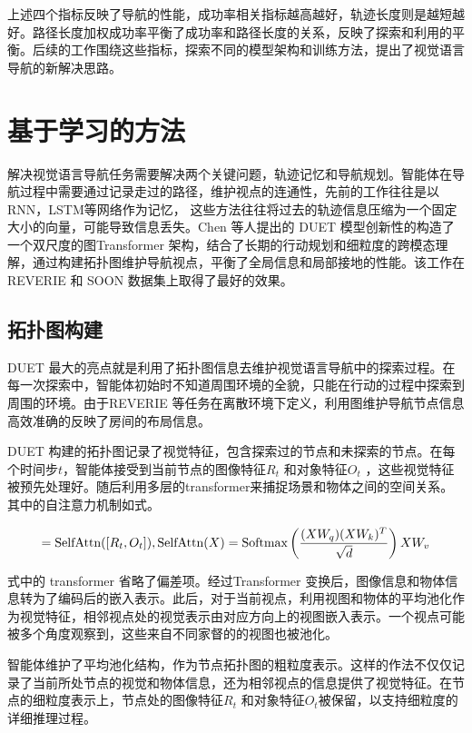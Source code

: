 \documentclass[bachelor]{thesis-uestc}
\begin{document}
上述四个指标反映了导航的性能，成功率相关指标越高越好，轨迹长度则是越短越好。路径长度加权成功率平衡了成功率和路径长度的关系，反映了探索和利用的平衡。后续的工作围绕这些指标，探索不同的模型架构和训练方法，提出了视觉语言导航的新解决思路。

\section{基于学习的方法}

解决视觉语言导航任务需要解决两个关键问题，轨迹记忆和导航规划。智能体在导航过程中需要通过记录走过的路径，维护视点的连通性，先前的工作往往是以RNN，LSTM等网络作为记忆， 这些方法往往将过去的轨迹信息压缩为一个固定大小的向量，可能导致信息丢失。Chen 等人提出的 DUET 模型创新性的构造了一个双尺度的图Transformer 架构，结合了长期的行动规划和细粒度的跨模态理解，通过构建拓扑图维护导航视点，平衡了全局信息和局部接地的性能。该工作在REVERIE 和 SOON 数据集上取得了最好的效果。

\subsection{拓扑图构建}


DUET 最大的亮点就是利用了拓扑图信息去维护视觉语言导航中的探索过程。在每一次探索中，智能体初始时不知道周围环境的全貌，只能在行动的过程中探索到周围的环境。由于REVERIE 等任务在离散环境下定义，利用图维护导航节点信息高效准确的反映了房间的布局信息。

DUET 构建的拓扑图记录了视觉特征，包含探索过的节点和未探索的节点。在每个时间步$t$，智能体接受到当前节点的图像特征$R_t$ 和对象特征$O_t$ ，这些视觉特征被预先处理好。随后利用多层的transformer来捕捉场景和物体之间的空间关系。其中的自注意力机制如式。

\begin{equation}
    [R'_{t}, O'_{t}] = \text{SelfAttn}([R_{t}, O_{t}]), \\
    \text{SelfAttn}(X) = \text{Softmax}\left( \frac{(XW_{q})(XW_{k})^{T}}{\sqrt{d}} \right) XW_{v}
\label{SelfAttn}
\end{equation}

式中的 transformer 省略了偏差项。经过Transformer 变换后，图像信息和物体信息转为了编码后的嵌入表示。此后，对于当前视点，利用视图和物体的平均池化作为视觉特征，相邻视点处的视觉表示由对应方向上的视图嵌入表示。一个视点可能被多个角度观察到，这些来自不同家督的的视图也被池化。

智能体维护了平均池化结构，作为节点拓扑图的粗粒度表示。这样的作法不仅仅记录了当前所处节点的视觉和物体信息，还为相邻视点的信息提供了视觉特征。在节点的细粒度表示上，节点处的图像特征$R_t$ 和对象特征$O_t$被保留，以支持细粒度的详细推理过程。
\end{document}
